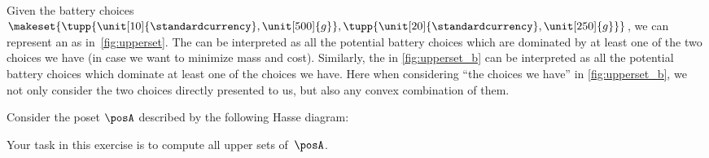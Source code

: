 \begin{marginfigure}
    \\
    \caption{}
\end{marginfigure}
%

Given the battery choices~$\makeset{\tupp{\unit[10]{\standardcurrency},\unit[500]{g}}, \tupp{\unit[20]{\standardcurrency},\unit[250]{g}}}$, we can represent an  as in~\cref{fig:upperset}.
The  can be interpreted as all the potential battery choices which are dominated by at least one of the two choices we have (in case we want to minimize mass and cost).
Similarly, the  in \cref{fig:upperset_b} can be interpreted as all the potential battery choices which dominate at least one of the choices we have.
Here when considering ``the choices we have'' in \cref{fig:upperset_b}, we not only consider the two choices directly presented to us, but also any convex combination of them.


\begin{gradedexercise}
    \label{ex:UpperSetsOfPreferences}

    Consider the poset $\posA$ described by the following Hasse diagram:
    \begin{center}
    \end{center}
    Your task in this exercise is to compute all upper sets of~$\posA$.
\end{gradedexercise}


\




